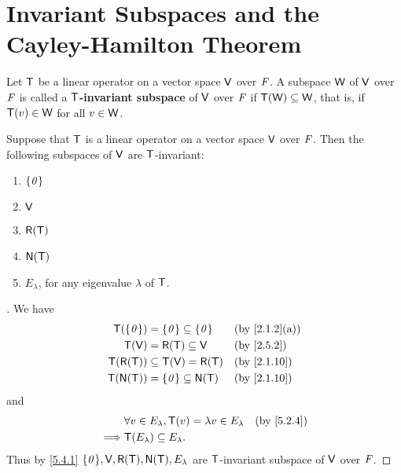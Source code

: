 \section{Invariant Subspaces and the Cayley-Hamilton Theorem}\label{sec:5.4}

\begin{defn}\label{5.4.1}
  Let \(\mathsf{T}\) be a linear operator on a vector space \(\mathsf{V}\) over \(\mathit{F}\).
  A subspace \(\mathsf{W}\) of \(\mathsf{V}\) over \(\mathit{F}\) is called a \textbf{\(\mathsf{T}\)-invariant subspace} of \(\mathsf{V}\) over \(\mathit{F}\) if \(\mathsf{T}(\mathsf{W}) \subseteq \mathsf{W}\), that is, if \(\mathsf{T}(v) \in \mathsf{W}\) for all \(v \in \mathsf{W}\).
\end{defn}

\begin{eg}\label{5.4.2}
  Suppose that \(\mathsf{T}\) is a linear operator on a vector space \(\mathsf{V}\) over \(\mathit{F}\).
  Then the following subspaces of \(\mathsf{V}\) are \(\mathsf{T}\)-invariant:
  \begin{enumerate}
    \item \(\left\lbrace\mathit{0}\right\rbrace\)
    \item \(\mathsf{V}\)
    \item \(\rg{\T}\)
    \item \(\ns{\T}\)
    \item \(E_{\lambda}\), for any eigenvalue \(\lambda\) of \(\mathsf{T}\).
  \end{enumerate}
\end{eg}

\begin{proof}[]
  We have
  \begin{align*}
    \T(\set{\zv}) & = \set{\zv} \subseteq \set{\zv} &  & \text{(by \cref{2.1.2}(a))} \\
    \T(\V)        & = \rg{\T} \subseteq \V          &  & \text{(by \cref{2.5.2})}    \\
    \T(\rg{\T})   & \subseteq \T(\V) = \rg{\T}      &  & \text{(by \cref{2.1.10})}   \\
    \T(\ns{\T})   & = \set{\zv} \subseteq \ns{\T}   &  & \text{(by \cref{2.1.10})}
  \end{align*}
  and
  \begin{align*}
             & \forall v \in E_{\lambda}, \T(v) = \lambda v \in E_{\lambda} &  & \text{(by \cref{5.2.4})} \\
    \implies & \T(E_{\lambda}) \subseteq E_{\lambda}.
  \end{align*}
  Thus by \cref{5.4.1} \(\set{\zv}, \V, \rg{\T}, \ns{\T}, E_{\lambda}\) are \(\mathsf{T}\)-invariant subspace of \(\mathsf{V}\) over \(\mathit{F}\).
\end{proof}

